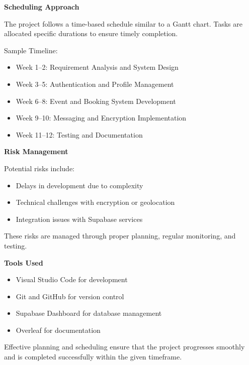 \documentclass[12pt,a4paper]{report}
\begin{document}
\textbf{Scheduling Approach}

The project follows a time-based schedule similar to a Gantt chart. Tasks are allocated specific durations to ensure timely completion.

Sample Timeline:

\begin{itemize}
\item Week 1–2: Requirement Analysis and System Design

\item Week 3–5: Authentication and Profile Management

\item Week 6–8: Event and Booking System Development

\item Week 9–10: Messaging and Encryption Implementation

\item Week 11–12: Testing and Documentation
\end{itemize}

\textbf{Risk Management}

Potential risks include:

\begin{itemize}
\item Delays in development due to complexity

\item Technical challenges with encryption or geolocation

\item Integration issues with Supabase services
\end{itemize}

These risks are managed through proper planning, regular monitoring, and testing.

\textbf{Tools Used}

\begin{itemize}
\item Visual Studio Code for development

\item Git and GitHub for version control

\item Supabase Dashboard for database management

\item Overleaf for documentation
\end{itemize}

Effective planning and scheduling ensure that the project progresses smoothly and is completed successfully within the given timeframe.
\end{document}
